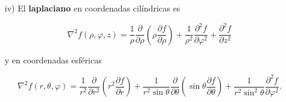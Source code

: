 \begin{itemize}
\item[iv)] El \textbf{laplaciano} en coordenadas cilíndricas es
\begin{shaded}
    $$\nabla^2 f(\rho, \varphi,z) = \frac{1}{\rho} \frac{\partial}{\partial \rho} \left(\rho \frac{\partial f}{\partial \rho} \right) + \frac{1}{\rho^2} \frac{\partial^2 f}{\partial \varphi^2}  + \frac{\partial^2 f}{\partial z^2}$$
\end{shaded}

y en coordenadas esféricas
\begin{shaded}
    $$\nabla^2 f(r,\theta,\varphi) = \frac{1}{r^2} \frac{\partial}{\partial r^2} \left( r^2 \frac{\partial f}{\partial r} \right) + \frac{1}{r^2 \sin\theta} \frac{\partial}{\partial \theta} \left( \sin \theta \frac{\partial f}{\partial \theta}\right) + \frac{1}{r^2 \sin^2\theta} \frac{\partial^2 f}{\partial \varphi^2}.$$
\end{shaded}
\end{itemize}




